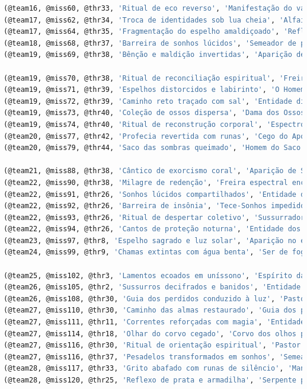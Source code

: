 \documentclass[12pt,a4paper]{report}
\begin{document}
\begin{lstlisting}[language=SQL, caption=population.sql]
(@team16, @miss60, @thr33, 'Ritual de eco reverso', 'Manifestação do vazio dispersa pelo próprio grito'),
(@team17, @miss62, @thr34, 'Troca de identidades sob lua cheia', 'Alfaiate espectral confundido e banido'),
(@team17, @miss64, @thr35, 'Fragmentação do espelho amaldiçoado', 'Reflexos ilusórios desfeitos'),
(@team18, @miss68, @thr37, 'Barreira de sonhos lúcidos', 'Semeador de pesadelos impedido de agir'),
(@team19, @miss69, @thr38, 'Bênção e maldição invertidas', 'Aparição de Santa Cecília pacificada'),

(@team19, @miss70, @thr38, 'Ritual de reconciliação espiritual', 'Freira espectral encontra paz'),
(@team19, @miss71, @thr39, 'Espelhos distorcidos e labirinto', 'O Homem Torto perdido em sua própria distorção'),
(@team19, @miss72, @thr39, 'Caminho reto traçado com sal', 'Entidade distorcida expulsa do plano material'),
(@team19, @miss73, @thr40, 'Coleção de ossos dispersa', 'Dama dos Ossos desfeita e ossos devolvidos'),
(@team19, @miss74, @thr40, 'Ritual de reconstrução corporal', 'Espectro da construção dissolvido'),
(@team20, @miss77, @thr42, 'Profecia revertida com runas', 'Cego do Apocalipse perde o dom e desaparece'),
(@team20, @miss79, @thr44, 'Saco das sombras queimado', 'Homem do Saco dissipado em fumaça'),

(@team21, @miss88, @thr38, 'Cântico de exorcismo coral', 'Aparição de Santa Cecília abençoada e liberta'),
(@team22, @miss90, @thr38, 'Milagre de redenção', 'Freira espectral encontra descanso eterno'),
(@team22, @miss91, @thr26, 'Sonhos lúcidos compartilhados', 'Entidade dos sonhos expulsa do inconsciente coletivo'),
(@team22, @miss92, @thr26, 'Barreira de insônia', 'Tece-Sonhos impedido de agir'),
(@team22, @miss93, @thr26, 'Ritual de despertar coletivo', 'Sussurrador banido dos sonhos'),
(@team22, @miss94, @thr26, 'Cantos de proteção noturna', 'Entidade dos sonhos dispersa'),
(@team23, @miss97, @thr8, 'Espelho sagrado e luz solar', 'Aparição no espelho dissipada'),
(@team24, @miss99, @thr9, 'Chamas extintas com água benta', 'Ser de fogo eterno apagado'),

(@team25, @miss102, @thr3, 'Lamentos ecoados em uníssono', 'Espírito da cripta aprisionado'),
(@team26, @miss105, @thr2, 'Sussurros decifrados e banidos', 'Entidade sombria dispersa do cemitério'),
(@team26, @miss108, @thr30, 'Guia dos perdidos conduzido à luz', 'Pastor espectral encontra redenção'),
(@team27, @miss110, @thr30, 'Caminho das almas restaurado', 'Guia dos perdidos retorna ao além'),
(@team27, @miss111, @thr11, 'Correntes reforçadas com magia', 'Entidade das correntes selada'),
(@team27, @miss114, @thr18, 'Olhar do corvo cegado', 'Corvo dos olhos perde o poder'),
(@team27, @miss116, @thr30, 'Ritual de orientação espiritual', 'Pastor espectral conduzido ao repouso'),
(@team27, @miss116, @thr37, 'Pesadelos transformados em sonhos', 'Semeador de pesadelos convertido'),
(@team28, @miss117, @thr33, 'Grito abafado com runas de silêncio', 'Manifestação do vazio silenciada'),
(@team28, @miss120, @thr25, 'Reflexo de prata e armadilha', 'Serpente prateada capturada e exilada');


\end{lstlisting}
\end{document}
